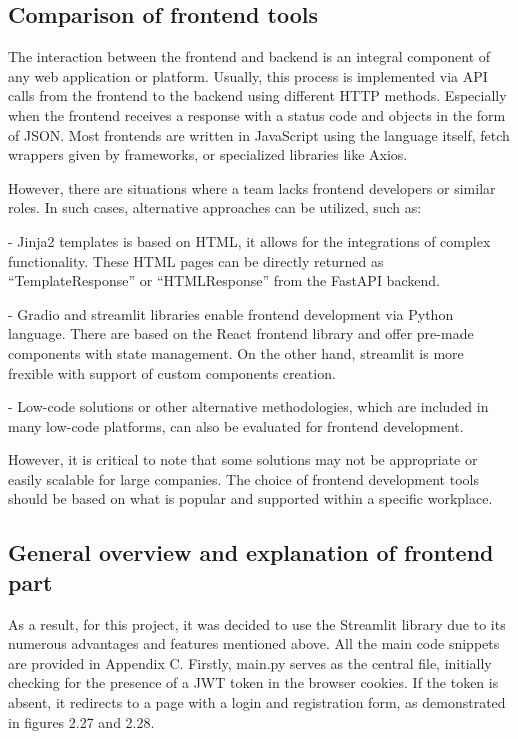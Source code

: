 \subsection{Comparison of frontend tools}
The interaction between the frontend and backend is an integral component of any web application or platform. Usually, this process is implemented via API calls from the frontend to the backend using different HTTP methods. Especially when the frontend receives a response with a status code and objects in the form of JSON. Most frontends are written in JavaScript using the language itself, fetch wrappers given by frameworks, or specialized libraries like Axios.

However, there are situations where a team lacks frontend developers or similar roles. In such cases, alternative approaches can be utilized, such as:

- Jinja2 templates is based on HTML, it allows for the integrations of complex functionality. These HTML pages can be directly returned as ``TemplateResponse'' or ``HTMLResponse'' from the FastAPI backend.

- Gradio and streamlit libraries enable frontend development via Python language. There are based on the React frontend library and offer pre-made components with state management. On the other hand, streamlit is more frexible with support of custom components creation. 

- Low-code solutions or other alternative methodologies, which are included in many low-code platforms, can also be evaluated for frontend development.

However, it is critical to note that some solutions may not be appropriate or easily scalable for large companies. The choice of frontend development tools should be based on what is popular and supported within a specific workplace.

\subsection{General overview and explanation of frontend part}
As a result, for this project, it was decided to use the Streamlit library due to its numerous advantages and features mentioned above. All the main code snippets are provided in Appendix C. Firstly, main.py serves as the central file, initially checking for the presence of a JWT token in the browser cookies. If the token is absent, it redirects to a page with a login and registration form, as demonstrated in figures 2.27 and 2.28.

